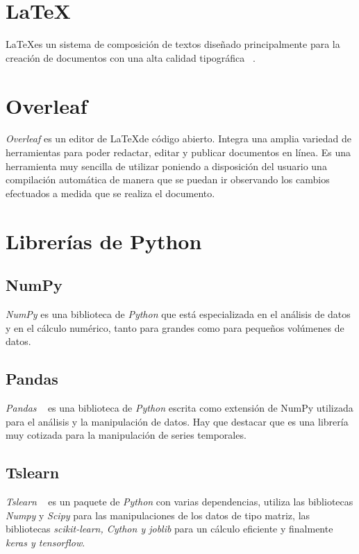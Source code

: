 \section{\LaTeX}
\LaTeX es un sistema de composición de textos diseñado principalmente para la creación de documentos con una alta calidad tipográfica ~\cite{wiki:latex}. 

\section{Overleaf}
\textit{Overleaf} es un editor de \LaTeX de código abierto. Integra una amplia variedad de herramientas para poder redactar, editar y publicar documentos en línea. Es una herramienta muy sencilla de utilizar poniendo a disposición del usuario una compilación automática de manera que se puedan ir observando los cambios efectuados a medida que se realiza el documento. 

\section{Librerías de Python} \label{cap:librerias}
\subsection{NumPy}
\textit{NumPy} es una biblioteca de \textit{Python} que está especializada en el análisis de datos y en el cálculo numérico, tanto para grandes como para pequeños volúmenes de datos. 

\subsection{Pandas}
\textit{Pandas} ~\cite{mckinney2011pandas} es una biblioteca de \textit{Python} escrita como extensión de NumPy utilizada para el análisis y la manipulación de datos. Hay que destacar que es una librería muy cotizada para la manipulación de series temporales.

\subsection{Tslearn} \label{cap:tslearn}
\textit{Tslearn} ~\cite{tavenard2020tslearn} es un paquete de \textit{Python} con varias dependencias, utiliza las bibliotecas \textit{Numpy} y \textit{Scipy} para las manipulaciones de los datos de tipo matriz, las bibliotecas \textit{scikit-learn, Cython y joblib} para un cálculo eficiente y finalmente \textit{keras y tensorflow}. 

